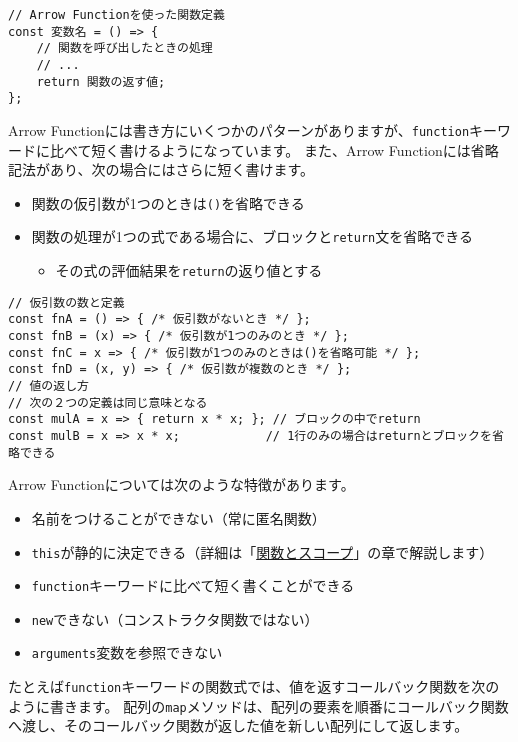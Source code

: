 \begin{lstlisting}
// Arrow Functionを使った関数定義
const 変数名 = () => {
    // 関数を呼び出したときの処理
    // ...
    return 関数の返す値;
};
\end{lstlisting}

Arrow
Functionには書き方にいくつかのパターンがありますが、\texttt{function}キーワードに比べて短く書けるようになっています。
また、Arrow Functionには省略記法があり、次の場合にはさらに短く書けます。

\begin{itemize}
\item
  関数の仮引数が1つのときは\texttt{()}を省略できる
\item
  関数の処理が1つの式である場合に、ブロックと\texttt{return}文を省略できる

  \begin{itemize}
  \item
    その式の評価結果を\texttt{return}の返り値とする
  \end{itemize}
\end{itemize}

\begin{lstlisting}
// 仮引数の数と定義
const fnA = () => { /* 仮引数がないとき */ };
const fnB = (x) => { /* 仮引数が1つのみのとき */ };
const fnC = x => { /* 仮引数が1つのみのときは()を省略可能 */ };
const fnD = (x, y) => { /* 仮引数が複数のとき */ };
// 値の返し方
// 次の２つの定義は同じ意味となる
const mulA = x => { return x * x; }; // ブロックの中でreturn
const mulB = x => x * x;            // 1行のみの場合はreturnとブロックを省略できる
\end{lstlisting}

Arrow Functionについては次のような特徴があります。

\begin{itemize}
\item
  名前をつけることができない（常に匿名関数）
\item
  \texttt{this}が静的に決定できる（詳細は「\hyperlink{function-and-scope}{関数とスコープ}」の章で解説します）
\item
  \texttt{function}キーワードに比べて短く書くことができる
\item
  \texttt{new}できない（コンストラクタ関数ではない）
\item
  \texttt{arguments}変数を参照できない
\end{itemize}

たとえば\texttt{function}キーワードの関数式では、値を返すコールバック関数を次のように書きます。
配列の\texttt{map}メソッドは、配列の要素を順番にコールバック関数へ渡し、そのコールバック関数が返した値を新しい配列にして返します。

